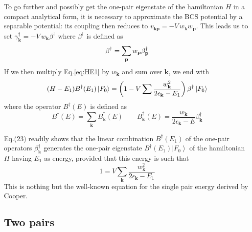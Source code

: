 \documentclass[aps,prb,superscriptaddress,twocolumn]{revtex4}
\newcommand{\vk}{\ensuremath{\mathbf{k}}}
\newcommand{\vp}{\ensuremath{\mathbf{p}}}
\begin{document}
To go further and possibly get the one-pair eigenstate of the hamiltonian $H$
in a compact analytical form, it is necessary to approximate the BCS potential by a separable potential: its
coupling then reduces to $v_{\mathbf{k} \mathbf{p} }=-V\,w_\vk{}w_\vp$.
This leads us to set $\gamma^{\dagger}_\vk=-V\,w_\vk\beta^{\dagger}$ where $\beta^{\dagger}$ is defined as 
\begin{equation}  \label{eq:gammaBeta}
\beta^{\dagger}=\sum_%
\vp{}w_\vp\beta^{\dagger}_\vp
\end{equation}
If we then multiply Eq.\eqref{eq:HE1} by $w_\vk$ and sum over $\mathbf{k} $,
we end with 
\begin{equation}
(H-E _1)B^{\dagger}(E _1)\left|F_0\right>  =\left(1-V\sum{%
\frac{w_\vk^2}{2\epsilon_\vk-E _1}}\right)
\beta^{\dagger}\left|F_0\right>  
\end{equation}
where the operator $B^{\dagger}(E)$ is defined as  
\begin{equation}  \label{eq:B}
B^{\dagger}(E)=\sum_\vk{B_\vk^{\dagger}(E)}\quad\quad B_\vk^{\dagger}(E)=\frac{w_\vk}{2\epsilon_\vk-E}\beta^{\dagger}_\vk
\end{equation}

Eq.(23) readily shows that the linear combination $B^{\dagger}(E _1)
$ of the one-pair operators $\beta^{\dagger}_\vk$ generates the one-pair eigenstate $B^{\dagger}(%
E _1)\left|F_0\right>  $ of the hamiltonian $H$ having  $%
E _1$ as energy, provided that this energy is such that 
\begin{equation}  \label{eq:SchOne}
1=V\sum_\vk{\frac{w_\vk^2}{2\epsilon_\vk-E _1}}
\end{equation}
This is nothing but the well-known equation for the single pair energy
derived by Cooper.

\subsection{Two pairs}
\end{document}
